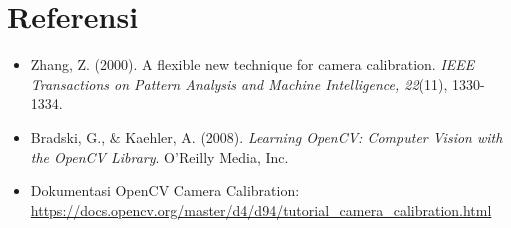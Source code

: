 \documentclass[12pt,a4paper]{article}
\begin{document}
\section*{Referensi}
\begin{itemize}
    \item Zhang, Z. (2000). A flexible new technique for camera calibration. \textit{IEEE
              Transactions on Pattern Analysis and Machine Intelligence, 22}(11), 1330-1334.
    \item Bradski, G., \& Kaehler, A. (2008). \textit{Learning OpenCV: Computer Vision
              with the OpenCV Library}. O'Reilly Media, Inc.
    \item Dokumentasi OpenCV Camera Calibration:
          \url{https://docs.opencv.org/master/d4/d94/tutorial_camera_calibration.html}
\end{itemize}
\end{document}
